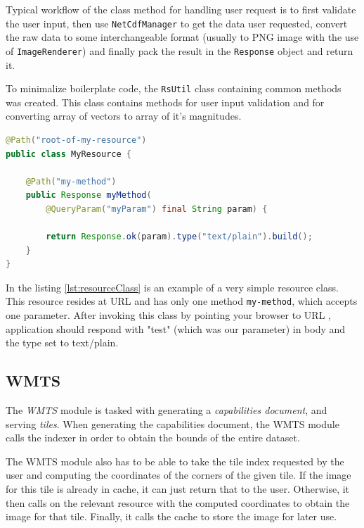 \documentclass[11pt,a4paper,titlepage,oneside]{report}
\begin{document}
Typical workflow of the class method for handling user request is to first validate the user input, then use \texttt{NetCdfManager} to get the data user requested, convert the raw data to some interchangeable format (usually to \gls{PNG} image with the use of \texttt{ImageRenderer}) and finally pack the result in the \texttt{Response} object and return it.

To minimalize boilerplate code, the \texttt{RsUtil} class containing common methods was created. This class contains methods for user input validation and for converting array of vectors to array of it's magnitudes.

\begin{minipage}{\linewidth}
\begin{lstlisting}[language=Java, caption=Example of a simple REST resource class, label=lst:resourceClass, frame=single]
@Path("root-of-my-resource")
public class MyResource {
    
    @Path("my-method")
    public Response myMethod(
        @QueryParam("myParam") final String param) {
        
        return Response.ok(param).type("text/plain").build();
    }
}
\end{lstlisting}
\end{minipage}

In the listing \ref{lst:resourceClass} is an example of a very simple resource class. This resource resides at \gls{URL}  and has only one method \texttt{my-method}, which accepts one parameter. After invoking this class by pointing your browser to \gls{URL} , application should respond with "test" (which was our parameter) in body and the type set to text/plain.

\subsection{WMTS}

The \textit{\gls{WMTS}} module is tasked with generating a \textit{capabilities document}, and serving \textit{tiles}. When generating the capabilities document, the \gls{WMTS} module calls the indexer in order to obtain the bounds of the entire dataset.

The \gls{WMTS} module also has to be able to take the tile index requested by the user and computing the coordinates of the corners of the given tile. If the image for this tile is already in cache, it can just return that to the user.
Otherwise, it then calls on the relevant resource with the computed coordinates to obtain the image for that tile. Finally, it calls the cache to store the image for later use.
\end{document}
